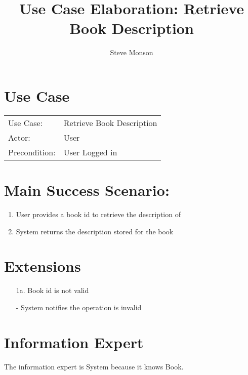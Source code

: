 \documentclass{article}
\title{Use Case Elaboration: Retrieve Book Description}
\author{ Steve Monson }
\begin{document}
\maketitle


\section*{Use Case}
\begin{tabular}{l l}
Use Case:     & Retrieve Book Description\\
Actor:        & User\\
Precondition: & User Logged in\\
\end{tabular}


\section*{Main Success Scenario:}

\begin{enumerate}
    \item User provides a book id to retrieve the description of
    \item System returns the description stored for the book
    
\end{enumerate}

\section*{Extensions}

\begin{itemize}
    \item [1a.] Book id is not valid
    
        - System notifies the operation is invalid
                            
\end{itemize}


\section*{Information Expert}
The information expert is System because it knows Book. 
\end{document}
